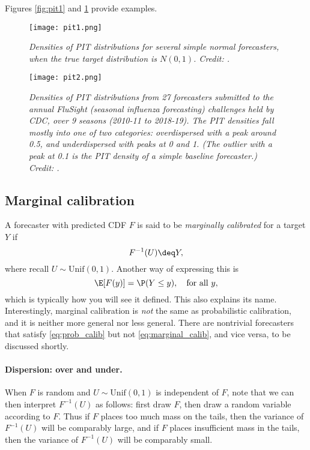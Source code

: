 \documentclass{article}
\begin{document}
Figures \ref{fig:pit1} and \ref{fig:pit2} provide examples.

\begin{figure}[p]
\centering
\texttt{[image: pit1.png]}
\vspace{-15pt}
\caption{\it Densities of PIT distributions for several simple normal
  forecasters, when the true target distribution is $N(0,1)$. Credit:
  \citet{rumack2022recalibrating}.}        
\label{fig:pit1}   

\bigskip\medskip

\texttt{[image: pit2.png]}
\caption{\it Densities of PIT distributions from 27 forecasters submitted to the
  annual FluSight (seasonal influenza forecasting) challenges held by CDC, over
  9 seasons (2010-11 to 2018-19). The PIT densities fall mostly into one of two
  categories: overdispersed with a peak around 0.5, and underdispersed with
  peaks at 0 and 1. (The outlier with a peak at 0.1 is the PIT density of a
  simple baseline forecaster.) Credit: \citet{rumack2022recalibrating}.}           
\label{fig:pit2}
\end{figure}

\subsection{Marginal calibration}

A forecaster with predicted CDF $F$ is said to be \emph{marginally calibrated}
for a target $Y$ if  
\begin{equation}
\label{eq:marginal_calib}
F^{-1}(U) \deq Y,
\end{equation}
where recall $U \sim \mathrm{Unif}(0,1)$. Another way of expressing this is  
\[
\E[F(y)] = \P(Y \leq y), \quad \text{for all $y$},
\]
which is typically how you will see it defined. This also explains its name. 
Interestingly, marginal calibration is \emph{not} the same as probabilistic
calibration, and it is neither more general nor less general. There are
nontrivial forecasters that satisfy \eqref{eq:prob_calib} but not
\eqref{eq:marginal_calib}, and vice versa, to be discussed shortly.  

\paragraph{Dispersion: over and under.}

When $F$ is random and $U \sim \mathrm{Unif}(0,1)$ is independent of $F$, note
that we can then interpret $F^{-1}(U)$ as follows: first draw $F$, then draw a
random variable according to $F$. Thus if $F$ places too much mass on the tails,
then the variance of $F^{-1}(U)$ will be comparably large, and if $F$ places 
insufficient mass in the tails, then the variance of $F^{-1}(U)$ will be
comparably small. 
\end{document}
